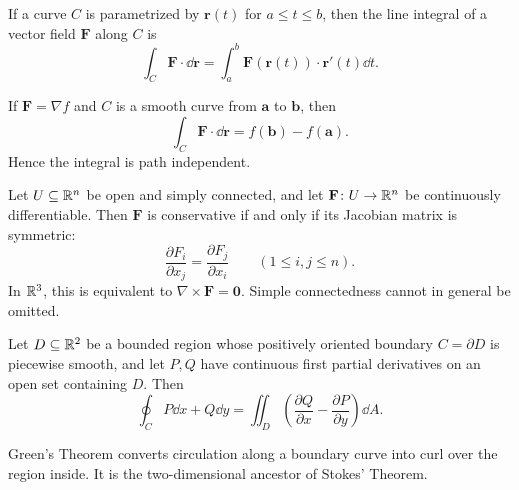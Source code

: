     \begin{definition}
        If a curve $C$ is parametrized by $\mathbf{r}(t)$ for $a\leq t\leq b$,
        then the line integral of a vector field $\mathbf{F}$ along $C$ is
        \[
            \int_C \mathbf{F}\cdot\dd\mathbf{r}
            =
            \int_a^b \mathbf{F}(\mathbf{r}(t))\cdot\mathbf{r}'(t)\dd t.
        \]
    \end{definition}

    \begin{theorem}
        If $\mathbf{F}=\nabla f$ and $C$ is a smooth curve from $\mathbf{a}$ to
        $\mathbf{b}$, then
        \[
            \int_C \mathbf{F}\cdot\dd\mathbf{r}
            =
            f(\mathbf{b})-f(\mathbf{a}).
        \]
        Hence the integral is path independent.
    \end{theorem}

    \begin{proposition}\label{pp:conservative}
        Let $U\subseteq\mathbb{R}^n$ be open and simply connected, and let
        $\mathbf{F}\colon U\to\mathbb{R}^n$ be continuously differentiable. Then
        $\mathbf{F}$ is conservative if and only if its Jacobian matrix is
        symmetric:
        \[
            \frac{\partial F_i}{\partial x_j}
            =
            \frac{\partial F_j}{\partial x_i}
            \qquad(1\leq i,j\leq n).
        \]
        In $\mathbb{R}^3$, this is equivalent to $\nabla\times\mathbf{F}=\mathbf{0}$.
        Simple connectedness cannot in general be omitted.
    \end{proposition}

    \begin{theorem}
        Let $D\subseteq\mathbb{R}^2$ be a bounded region whose positively oriented
        boundary $C=\partial D$ is piecewise smooth, and let $P,Q$ have
        continuous first partial derivatives on an open set containing $D$.
        Then
        \[
            \oint_C P\dd x+Q\dd y
            =
            \iint_D
            \left(
                \frac{\partial Q}{\partial x}
                -
                \frac{\partial P}{\partial y}
            \right)\dd A.
        \]
    \end{theorem}

    \begin{idea}
        Green's Theorem converts circulation along a boundary curve into curl
        over the region inside. It is the two-dimensional ancestor of Stokes'
        Theorem.
    \end{idea}


